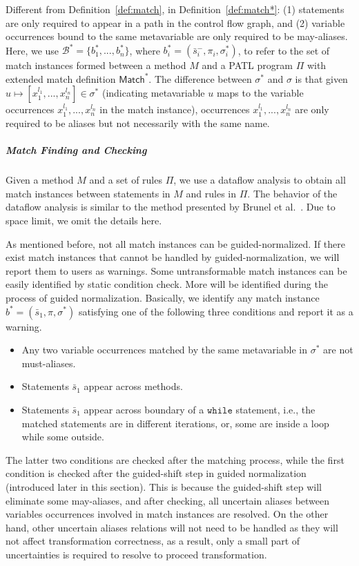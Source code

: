 \documentclass[letterpaper, USenglish]{lipics-v2016}
\newcommand{\PATL}{PATL\xspace}
\theoremstyle{plain}
\begin{document}
Different from Definition~\ref{def:match}, in Definition~\ref{def:match*}: (1) statements are only required to appear in a path in the control flow graph, and (2) variable occurrences bound to the same metavariable are only required to be may-aliases. Here, we use $\mathcal{B}^*=\{b_1^*,...,b_n^*\}$, where
$b_i^*=(\bar{s}^-_i,\pi_i,\sigma_i^*)$, to refer to the set of match
instances formed between a method $M$ and a \PATL program $\Pi$ with
extended match definition $\mathsf{Match^*}$. The difference between
$\sigma^*$ and $\sigma$ is that given
$u\mapsto[x_1^{l_1},...,x_n^{l_n}]\in\sigma^*$ (indicating
metavariable $u$ maps to the variable occurrences
$x_1^{l_1},...,x_n^{l_n}$ in the match instance), occurrences
$x_1^{l_1},...,x_n^{l_n}$ are only required to be aliases but not
necessarily with the same name.

\subparagraph*{Match Finding and Checking}
Given a method $M$ and a set of rules $\Pi$, we use a dataflow
analysis to obtain all match instances between statements in $M$ and
rules in $\Pi$. The behavior of the dataflow analysis is similar to
the method presented by Brunel et
al.~\cite{DBLP:conf/popl/BrunelDHLM09}. Due to space limit, we
omit the details here.

As mentioned before, not all match instances can be
guided-normalized. If there exist match instances that cannot be
handled by guided-normalization, we will report them to users as
warnings. Some untransformable match instances can be easily identified by
static condition check. More will be identified during the process of
guided normalization.
Basically, we identify any match instance
$b^*=(\bar{s}_1,\pi,\sigma^*)$ satisfying one of the following three
conditions and report it as a warning. 
\begin{itemize}
\item Any two variable occurrences matched by the same metavariable in
  $\sigma^*$ are not must-aliases.
\item Statements $\bar{s}_1$ appear across methods.
\item Statements $\bar{s}_1$ appear across boundary of a
  $\mathtt{while}$ statement, i.e., the matched statements are in
  different iterations, or, some are inside a loop while some outside.
\end{itemize}
The latter two conditions are checked after the matching process,
while the first condition is checked after the guided-shift step in
guided normalization (introduced later in this section). This is
because the guided-shift step will eliminate some may-aliases, and after checking,
all uncertain aliases between variables occurrences involved in match instances are resolved. On the other hand, other uncertain aliases relations will not need to be handled as they will not affect transformation correctness, as a result, only a small part of uncertainties is required to resolve to proceed transformation.
\end{document}
